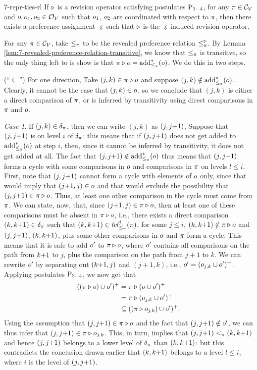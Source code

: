 \begin{thm}{}{7-repr-ties-rl}
	If $\triangleright$ is a revision operator satisfying postulates $\mathrm{P}_{1-4}$,
	for any $\pi\in\mathcal{C}_V$ and $o,o_1,o_2\in\mathcal{O}_V$ such that $o_1$, $o_2$ are coordinated 
	with respect to $\pi$,
	then there exists a preference assignment $\preccurlyeq$ 
	such that $\triangleright$ is the $\preccurlyeq$-induced revision operator.
\end{thm}
\begin{prf*}{}{}%
	For any $\pi\in\mathcal{C}_V$, take $\le_\pi$ to be the revealed preference relation $\le^\triangleright_\pi$.
	By Lemma \ref{lem:7-revealed-preference-relation-transitive}, we know that 
	$\le_\pi$ is transitive, 
	so the only thing left to is show is that $\pi\triangleright o = {\operatorname{add}}^\ast_{\le_\pi}(o)$.
	We do this in two steps.
	
	(``$\subseteq$'') 
	For one direction, 
	Take $(j,k)\in\pi\triangleright o$ and suppose 
	$(j,k)\notin{\operatorname{add}}^\ast_{\le_\pi}(o)$.
	Clearly, it cannot be the case that $(j,k)\in o$, so we conclude that $(j,k)$
	is either a direct comparison of $\pi$, or is inferred by transitivity using direct comparisons in $\pi$
	and $o$. 	
	
	\emph{Case 1}. If $(j,k)\in\delta_\pi$, then we can write $(j,k)$ as $({j},{j}{+}{1})$,
	Suppose that $({j},{j}{+}{1})$ is on level $i$ of $\delta_\pi$: this means that if $({j},{j}{+}{1})$ does not get added to 
	${\operatorname{add}}^\ast_{\le_\pi}(o)$ at step $i$, then, since it cannot be inferred by transitivity,
	it does not get added at all. The fact that $({j},{j}{+}{1})\notin{\operatorname{add}}^\ast_{\le_\pi}(o)$ thus means that
	$({j},{j}{+}{1})$ forms a cycle with some comparisons in $o$ and comparisons in $\pi$ on levels $l\le i$.
	First, note that $({j},{j}{+}{1})$ cannot form a cycle with elements of $o$ only, since that would imply
	that $(j{+}1,j)\in o$ and that would exclude the possibility that $({j},{j}{+}{1})\in\pi\triangleright o$.
	Thus, at least one other comparison in the cycle must come from $\pi$.
	We can state, now, that, since $(j{+}1,j)\in\pi\triangleright o$, then at least one of these comparisons 
	must be absent in $\pi\triangleright o$,
	i.e., there exists a direct comparison $({k},{k}{+}{1})\in\delta_\pi$ such that $({k},{k}{+}{1})\in\mathit{lvl}^j_{\le_\pi}(\pi)$,
	for some $j\le i$, 
	$({k},{k}{+}{1})\notin\pi\triangleright o$ and $({j},{j}{+}{1})$, $({k},{k}{+}{1})$, plus some other comparisons in $o$ and $\pi$ form a cycle.
	This means that it is safe to add $o'$ to $\pi\triangleright o$, where $o'$ contains all comparisons on the path from ${k}{+}{1}$ to $j$,	plus the comparison on the path from $j{+}1$ to $k$.
	We can rewrite $o'$ by separating out $({k}{+}{1},j)$ and $(j{+}1,k)$, i.e., $o'=(o_{j,k}\cup o')^+$.
	Applying postulates $\mathrm{P}_{3-4}$, we now get that
	\begin{align*}
	((\pi\triangleright o)\cup o')^+ &= \pi\triangleright(o\cup o')^+\\
					   &= \pi\triangleright(o_{j,k}\cup o')^+\\
					   &\subseteq ((\pi\triangleright o_{j,k})\cup o')^+.						   
	\end{align*}
	Using the assumption that $({j},{j}{+}{1})\in\pi\triangleright o$ and the fact that $({j},{j}{+}{1})\notin{o'}$, 
	we can thus infer that $({j},{j}{+}{1})\in\pi\triangleright o_{j,k}$.
	This, in turn, implies that $({j},{j}{+}{1})<_\pi({k},{k}{+}{1})$ and hence $({j},{j}{+}{1})$ belongs to 
	a lower level of $\delta_\pi$ than $({k},{k}{+}{1})$: but this contradicts the conclusion drawn earlier
	that $({k},{k}{+}{1})$ belongs to a level $l\le i$, where $i$ is the level of $({j},{j}{+}{1})$. 


\end{prf*}
